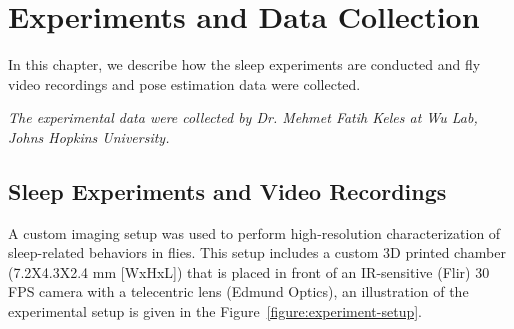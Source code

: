 \setlength{\parindent}{0pt}
\chapter{Experiments and Data Collection}\label{chapter:expt-data-collection}
In this chapter, we describe how the sleep experiments are conducted and fly video recordings and pose estimation data were collected.

\textit{The experimental data were collected by Dr. Mehmet Fatih Keles at Wu Lab, Johns Hopkins University.}

\section{Sleep Experiments and Video Recordings}
A custom imaging setup was used to perform high-resolution characterization of sleep-related behaviors in flies.
This setup includes a custom 3D printed chamber (7.2X4.3X2.4 mm [WxHxL]) that is placed in front of an IR-sensitive (Flir) 30 FPS camera with a telecentric lens (Edmund Optics), an illustration of the experimental setup is given in the Figure~\ref{figure:experiment-setup}.

